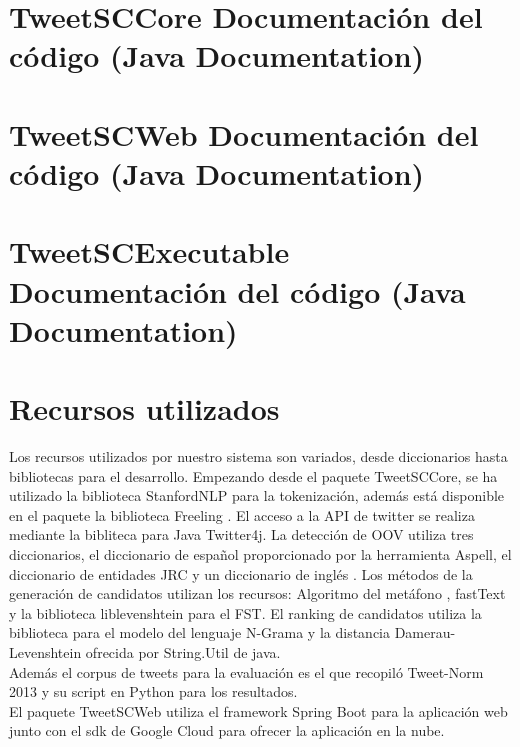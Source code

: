 \documentclass[spanish,12pt, a4paper,twoside]{paper}
\let\oldsection\section
\def\section{\cleardoublepage\oldsection}
\begin{document}
\section{TweetSCCore Documentación del código (Java Documentation)}\label{sec:tweetsccorejavadoc}


\section{TweetSCWeb Documentación del código (Java Documentation)}\label{sec:tweetscwebjavadoc}


\section{TweetSCExecutable Documentación del código (Java Documentation)}\label{sec:tweetscexecutablejavadoc}


\section{Recursos utilizados}\label{sec:recursosutilizados}
Los recursos utilizados por nuestro sistema son variados, desde diccionarios hasta bibliotecas para el desarrollo. Empezando desde el paquete TweetSCCore, se ha utilizado la biblioteca StanfordNLP \cite{stanfordnlp} para la tokenización, además está disponible en el paquete la biblioteca Freeling \cite{freeling}. El acceso a la API de twitter se realiza mediante la bibliteca para Java Twitter4j. La detección de OOV utiliza tres diccionarios, el diccionario de español proporcionado por la herramienta Aspell, el diccionario de entidades JRC y un diccionario de inglés \cite{englishdictionary}. Los métodos de la generación de candidatos utilizan los recursos: Algoritmo del metáfono \cite{mosquera:2011}, fastText \cite{facebook:fasttext} y la biblioteca liblevenshtein \cite{liblevenshtein} para el FST. El ranking de candidatos utiliza la biblioteca \cite{opennlp} para el modelo del lenguaje N-Grama y la distancia Damerau-Levenshtein ofrecida por String.Util de java.\\

Además el corpus de tweets para la evaluación es el que recopiló Tweet-Norm 2013 \cite{alegria:2013} y su script en Python para los resultados.\\

El paquete TweetSCWeb utiliza el framework Spring Boot para la aplicación web junto con el sdk de Google Cloud para ofrecer la aplicación en la nube.
\end{document}
